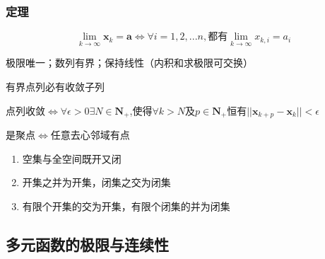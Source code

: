 \subsubsection{定理}
\begin{theorem}
	\begin{equation}\label{key}
		\lim\limits_{k\to \infty}\bm{x}_k=\bm{a} 
		\iff
		\forall i=1,2,...n,\text{都有}\lim\limits_{k\to \infty}x_{k,i}=a_i
	\end{equation}
\end{theorem}
\begin{theorem}[收敛的必要条件]
	极限唯一；数列有界；保持线性（内积和求极限可交换）
\end{theorem}
\begin{theorem}
	有界点列必有收敛子列
\end{theorem}
\begin{theorem}[Cauchy收敛原理]
	点列收敛$ \iff \forall \epsilon >0 \exists N\in \mathbf{N}_+$,使得$ \forall k>N $及$ p\in \mathbf{N}_+ $恒有$ ||\bm{x}_{k+p}-\bm{x}_k||<\epsilon $
\end{theorem}
\begin{theorem}
	是聚点$ \iff $任意去心邻域有点
\end{theorem}
\begin{theorem}
	\begin{enumerate}
		\item 空集与全空间既开又闭
		\item 开集之并为开集，闭集之交为闭集
		\item 有限个开集的交为开集，有限个闭集的并为闭集
	\end{enumerate}
\end{theorem}

\subsection{多元函数的极限与连续性}
